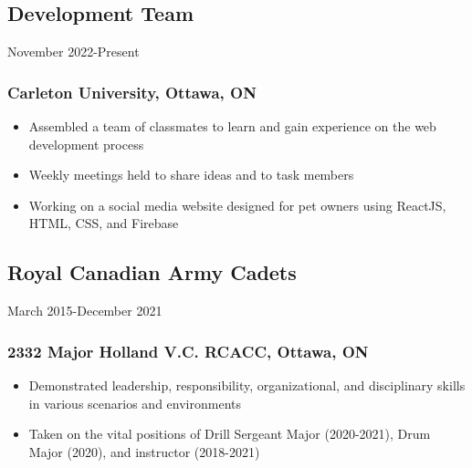\documentclass{article}
\newenvironment{itemlist}
{\begin{itemize}
	\setlength{\itemsep}{0em}
	\setlength{\parskip}{0em}
	\setlength{\parsep}{0em}
}
{\end{itemize}}
\begin{document}
\subsection{Development Team}\hfill{November 2022-Present
\subsubsection{Carleton University, Ottawa, ON}
\begin{itemlist}
\item Assembled a team of classmates to learn and gain experience on the web development process
\item Weekly meetings held to share ideas and to task members
\item Working on a social media website designed for pet owners using ReactJS, HTML, CSS, and Firebase
\end{itemlist}

\subsection{Royal Canadian Army Cadets}\hfill{March 2015-December 2021}
\subsubsection{2332 Major Holland V.C. RCACC, Ottawa, ON}
\begin{itemlist}
\item Demonstrated leadership, responsibility, organizational, and disciplinary skills in various scenarios and environments
\item Taken on the vital positions of Drill Sergeant Major (2020-2021), Drum Major (2020), and instructor (2018-2021)
\end{itemlist}
\end{document}
